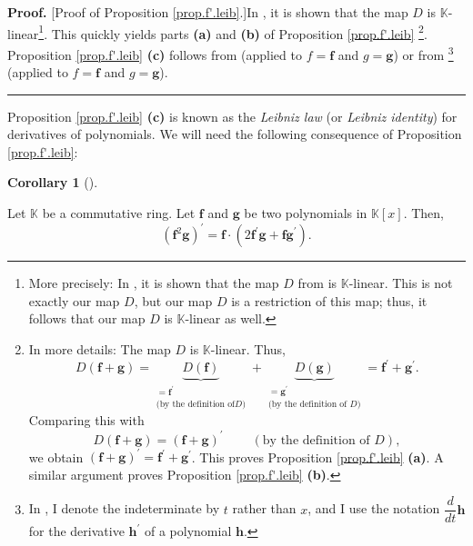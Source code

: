 \documentclass[numbers=enddot,12pt,final,onecolumn,notitlepage]{scrartcl}%
\theoremstyle{definition}
\newtheorem{coro}[theo]{Corollary}
\newenvironment{corollary}[1][]
{\begin{coro}[#1]\begin{leftbar}}
{\end{leftbar}\end{coro}}
\newenvironment{proof}[1][Proof]{\noindent\textbf{#1.} }{\ \rule{0.5em}{0.5em}}
\begin{document}
\begin{proof}
[Proof of Proposition \ref{prop.f'.leib}.]In \cite[Exercise 5 \textbf{(b)}%
]{19s-mt3s}, it is shown that the map $D$ is $\mathbb{K}$-linear\footnote{More
precisely: In \cite[Exercise 5 \textbf{(b)}]{19s-mt3s}, it is shown that the
map $D$ from \cite[Exercise 5]{19s-mt3s} is $\mathbb{K}$-linear. This is not
exactly our map $D$, but our map $D$ is a restriction of this map; thus, it
follows that our map $D$ is $\mathbb{K}$-linear as well.}. This quickly yields
parts \textbf{(a)} and \textbf{(b)} of Proposition \ref{prop.f'.leib}%
\footnote{In more details: The map $D$ is $\mathbb{K}$-linear. Thus,%
\[
D\left(  \mathbf{f}+\mathbf{g}\right)  =\underbrace{D\left(  \mathbf{f}%
\right)  }_{\substack{=\mathbf{f}^{\prime}\\\text{(by the definition of
}D\text{)}}}+\underbrace{D\left(  \mathbf{g}\right)  }_{\substack{=\mathbf{g}%
^{\prime}\\\text{(by the definition of }D\text{)}}}=\mathbf{f}^{\prime
}+\mathbf{g}^{\prime}.
\]
Comparing this with%
\[
D\left(  \mathbf{f}+\mathbf{g}\right)  =\left(  \mathbf{f}+\mathbf{g}\right)
^{\prime}\ \ \ \ \ \ \ \ \ \ \left(  \text{by the definition of }D\right)  ,
\]
we obtain $\left(  \mathbf{f}+\mathbf{g}\right)  ^{\prime}=\mathbf{f}^{\prime
}+\mathbf{g}^{\prime}$. This proves Proposition \ref{prop.f'.leib}
\textbf{(a)}. A similar argument proves Proposition \ref{prop.f'.leib}
\textbf{(b)}.}. Proposition \ref{prop.f'.leib} \textbf{(c)} follows from
\cite[Exercise 5 \textbf{(c)}]{19s-mt3s} (applied to $f=\mathbf{f}$ and
$g=\mathbf{g}$) or from \cite[Proposition 0.2 \textbf{(c)}]{Grinbe18}%
\footnote{In \cite{Grinbe18}, I denote the indeterminate by $t$ rather than
$x$, and I use the notation $\dfrac{d}{dt}\mathbf{h}$ for the derivative
$\mathbf{h}^{\prime}$ of a polynomial $\mathbf{h}$.} (applied to
$f=\mathbf{f}$ and $g=\mathbf{g}$).
\end{proof}

Proposition \ref{prop.f'.leib} \textbf{(c)} is known as the \textit{Leibniz
law} (or \textit{Leibniz identity}) for derivatives of polynomials. We will
need the following consequence of Proposition \ref{prop.f'.leib}:

\begin{corollary}
\label{cor.f'.leib2}Let $\mathbb{K}$ be a commutative ring. Let $\mathbf{f}$
and $\mathbf{g}$ be two polynomials in $\mathbb{K}\left[  x\right]  $. Then,%
\[
\left(  \mathbf{f}^{2}\mathbf{g}\right)  ^{\prime}=\mathbf{f}\cdot\left(
2\mathbf{f}^{\prime}\mathbf{g}+\mathbf{fg}^{\prime}\right)  .
\]

\end{corollary}
\end{document}
